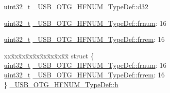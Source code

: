 \begin{DoxyCompactItemize}
\begin{tabbing}
\end{tabbing}\item 
\hyperlink{stdint_8h_a435d1572bf3f880d55459d9805097f62}{uint32\-\_\-t} \hyperlink{group___u_s_b___o_t_g___d_r_i_v_e_r_gafd506c89dade12ecf502cb311765a9f7}{\-\_\-\-U\-S\-B\-\_\-\-O\-T\-G\-\_\-\-H\-F\-N\-U\-M\-\_\-\-Type\-Def\-::d32}
\item 
\hyperlink{stdint_8h_a435d1572bf3f880d55459d9805097f62}{uint32\-\_\-t} \hyperlink{group___u_s_b___o_t_g___d_r_i_v_e_r_gab61a09b828122eeb28511a7e31f67ec0}{\-\_\-\-U\-S\-B\-\_\-\-O\-T\-G\-\_\-\-H\-F\-N\-U\-M\-\_\-\-Type\-Def\-::frnum}\-: 16
\item 
\hyperlink{stdint_8h_a435d1572bf3f880d55459d9805097f62}{uint32\-\_\-t} \hyperlink{group___u_s_b___o_t_g___d_r_i_v_e_r_ga0b1c8ac23ba14c94587b89a7a5afaa94}{\-\_\-\-U\-S\-B\-\_\-\-O\-T\-G\-\_\-\-H\-F\-N\-U\-M\-\_\-\-Type\-Def\-::frrem}\-: 16
\item 
\begin{tabbing}
xx\=xx\=xx\=xx\=xx\=xx\=xx\=xx\=xx\=\kill
struct \{\\
\>\hyperlink{stdint_8h_a435d1572bf3f880d55459d9805097f62}{uint32\_t} \hyperlink{group___u_s_b___o_t_g___d_r_i_v_e_r_gab61a09b828122eeb28511a7e31f67ec0}{\_USB\_OTG\_HFNUM\_TypeDef::frnum}: 16\\
\>\hyperlink{stdint_8h_a435d1572bf3f880d55459d9805097f62}{uint32\_t} \hyperlink{group___u_s_b___o_t_g___d_r_i_v_e_r_ga0b1c8ac23ba14c94587b89a7a5afaa94}{\_USB\_OTG\_HFNUM\_TypeDef::frrem}: 16\\
\} \hyperlink{group___u_s_b___o_t_g___d_r_i_v_e_r_gafbb7fd9abadae573851c92e650544422}{\_USB\_OTG\_HFNUM\_TypeDef::b}\\


\end{tabbing}
\end{DoxyCompactItemize}
